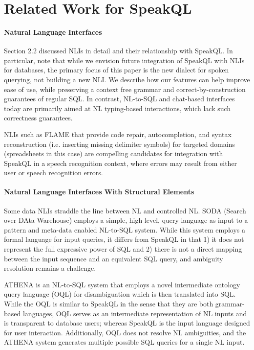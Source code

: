 \section{Related Work for SpeakQL}


\paragraph{\textbf{Natural Language Interfaces}}

Section 2.2 discussed NLIs in detail and their relationship with SpeakQL. 
In particular, note that while we envision future integration of SpeakQL with NLIs for databases, the primary focus of this paper is the new dialect for spoken querying, not building a new NLI. 
We describe how our features can help improve ease of use, while preserving a context free grammar and correct-by-construction guarantees of regular SQL.
In contrast, NL-to-SQL and chat-based interfaces today are primarily aimed at NL typing-based interactions, which lack such correctness guarantees.

NLIs such as FLAME \cite{joshi2023flame} that provide code repair, autocompletion, and syntax reconstruction (i.e. inserting missing delimiter symbols) for targeted domains (spreadsheets in this case) are compelling candidates for integration with SpeakQL in a speech recognition context, where errors may result from either user or speech recognition errors.

\paragraph{\textbf{Natural Language Interfaces With Structural Elements}}

Some data NLIs straddle the line between NL and controlled NL. SODA (Search over DAta Warehouse) \cite{10.14778/2336664.2336667} employs a simple, high level, query language as input to a pattern and meta-data enabled NL-to-SQL system. 
While this system employs a formal language for input queries, it differs from SpeakQL in that 1) it does not represent the full expressive power of SQL and 2) there is not a direct mapping between the input sequence and an equivalent SQL query, and ambiguity resolution remains a challenge. 

ATHENA \cite{10.14778/2994509.2994536} is an NL-to-SQL system that employs a novel intermediate ontology query language (OQL) for disambiguation which is then translated into SQL. While the OQL is similar to SpeakQL in the sense that they are both grammar-based languages, OQL serves as an intermediate representation of NL inputs and is transparent to database users; whereas SpeakQL is the input language designed for user interaction. Additionally, OQL does not resolve NL ambiguities, and the ATHENA system generates multiple possible SQL queries for a single NL input.

